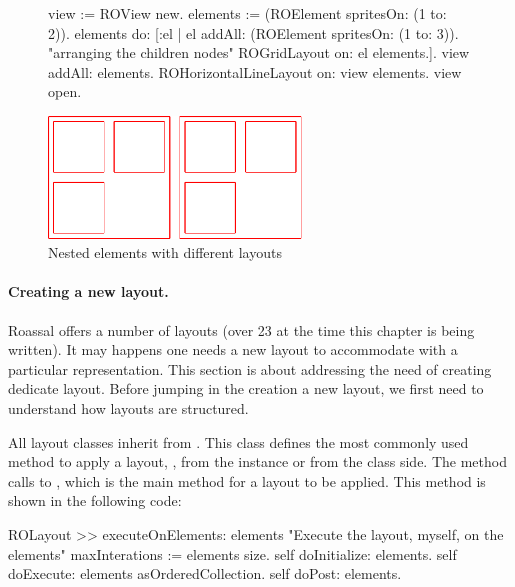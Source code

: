 \documentclass[a4paper,10pt,twoside]{book}
\begin{document}
\begin{figure}[H]
      \begin{minipage}[t]{0.61\textwidth}
      \vspace{0pt}
     \begin{code}{}
view := ROView new.
elements := (ROElement spritesOn: (1 to: 2)).
elements 
	do: [:el | el addAll: (ROElement spritesOn: (1 to: 3)). 
	           "arranging the children nodes"
			   ROGridLayout on: el elements.].			   
view addAll: elements.
ROHorizontalLineLayout on: view elements.
view open.
  \end{code}
   \end{minipage}
   \hfill
   \begin{minipage}[t]{0.5\textwidth}
      \vspace{0pt}\raggedright
       \centering
		\includegraphics[width=0.6\textwidth]{nestedLayout}
   \end{minipage}
\label{fig:nestedLayout}
\caption{Nested elements with different layouts }
\end{figure} 


\paragraph{Creating a new layout.}

Roassal offers a number of layouts (over 23 at the time this chapter is being written). It may happens one needs a new layout to accommodate with a particular representation. This section is about addressing the need of creating dedicate layout.
Before jumping in the creation a new layout, we first need to understand how layouts are structured.

All layout classes inherit from . 
This class defines the most commonly used method to apply a layout, , from the instance or from the class side. The method  calls to , which is the main method for a layout to be applied. This method is shown in the following code:

\begin{code}{}
ROLayout >> executeOnElements: elements 
	"Execute the layout, myself, on the elements"	
	maxInterations := elements size.
	self doInitialize: elements.
	self doExecute: elements asOrderedCollection.
	self doPost: elements.
\end{code}
\end{document}
